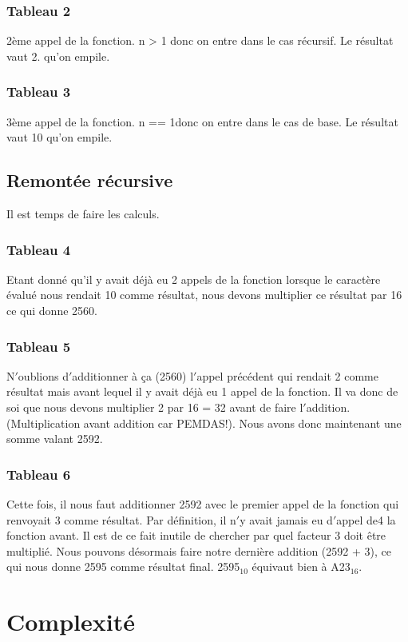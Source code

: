 \documentclass[a4paper, 11pt, oneside]{article}
\begin{document}
\subsubsection{Tableau 2}
2ème appel de la fonction. n > 1 donc on entre dans le cas récursif. Le résultat 
vaut 2. qu'on empile.

\subsubsection{Tableau 3}
3ème appel de la fonction. n == 1donc on entre dans le cas de base. Le résultat 
vaut 10 qu'on empile.

\subsection{Remontée récursive}
Il est temps de faire les calculs.

\subsubsection{Tableau 4}
Etant donné qu'il y avait déjà eu 2 appels de la fonction lorsque le caractère
évalué nous rendait 10 comme résultat, nous devons multiplier ce résultat par 
16 ce qui donne 2560.

\subsubsection{Tableau 5}
N$'$oublions d$'$additionner à ça (2560) l$'$appel précédent qui rendait 2 comme
résultat mais avant lequel il y avait déjà eu 1 appel de la fonction. Il va donc 
de soi que nous devons multiplier 2 par 16 = 32 avant de faire l$'$addition.
(Multiplication avant addition car PEMDAS!). Nous avons donc maintenant une somme 
valant 2592.

\subsubsection{Tableau 6}
Cette fois, il nous faut additionner 2592 avec le premier appel de la fonction qui
renvoyait 3 comme résultat. Par définition, il n$'$y avait jamais eu d$'$appel de4
la fonction avant. Il est de ce fait inutile de chercher par quel facteur 3 doit 
être multiplié. Nous pouvons désormais faire notre dernière addition (2592 + 3), 
ce qui nous donne 2595 comme résultat final. 2595$_{10}$ équivaut bien à 
A23$_{16}$.


\section{Complexité}\label{complexite}
%
%
\end{document}
